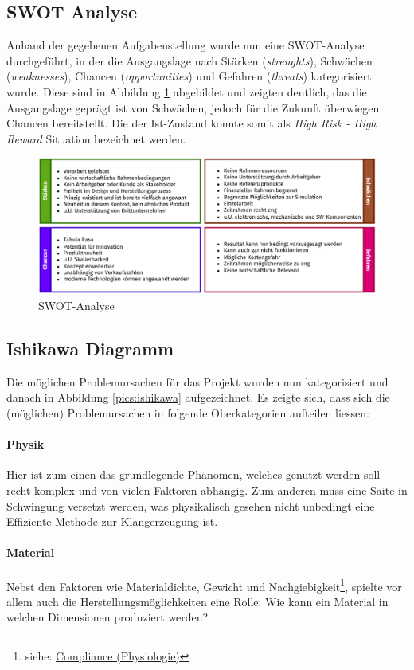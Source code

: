 \subsection{SWOT Analyse}
Anhand der gegebenen Aufgabenstellung wurde nun eine SWOT-Analyse durchgeführt, in der die Ausgangslage nach Stärken (\textit{strenghts}), Schwächen (\textit{weaknesses}), Chancen (\textit{opportunities}) und Gefahren (\textit{threats}) kategorisiert wurde. Diese sind in Abbildung \ref{pics:swot}  abgebildet und zeigten deutlich, das die Ausgangslage geprägt ist von Schwächen, jedoch für die Zukunft überwiegen Chancen bereitstellt. Die der Ist-Zustand konnte somit als \textit{High Risk - High Reward} Situation bezeichnet werden.
\begin{figure}[H]
	\centering
	\includegraphics[width=\textwidth]{pictures/SWOT.pdf}
	\caption{SWOT-Analyse}
	\label{pics:swot}
\end{figure}
\subsection{Ishikawa Diagramm}
Die möglichen Problemursachen für das Projekt wurden nun kategorisiert und danach in Abbildung \ref{pics:ishikawa} aufgezeichnet. Es zeigte sich, dass sich die (möglichen) Problemursachen in folgende Oberkategorien aufteilen liessen:
\paragraph{Physik} Hier ist zum einen das grundlegende Phänomen, welches genutzt werden soll recht komplex und von vielen Faktoren abhängig. Zum anderen muss eine Saite in Schwingung versetzt werden, was physikalisch gesehen nicht unbedingt eine Effiziente Methode zur Klangerzeugung ist.
\paragraph{Material} Nebst den Faktoren wie Materialdichte, Gewicht und Nachgiebigkeit\footnote{siehe: \href{https://de.wikipedia.org/wiki/Compliance_(Physiologie)}{Compliance (Physiologie)}}, spielte vor allem auch die Herstellungsmöglichkeiten eine Rolle: Wie kann ein Material in welchen Dimensionen produziert werden?
